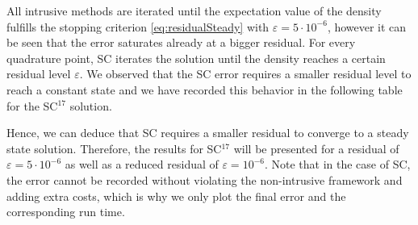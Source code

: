 All intrusive methods are iterated until the expectation value of the density fulfills the stopping criterion \eqref{eq:residualSteady} with $\varepsilon = 5\cdot 10^{-6}$, however it can be seen that the error saturates already at a bigger residual. For every quadrature point, SC iterates the solution until the density reaches a certain residual level $\varepsilon$. We observed that the SC error requires a smaller residual level to reach a constant state and we have recorded this behavior in the following table  for the SC$^{17}$ solution.
\begin{center}
\begin{table}
\caption{}
\label{tab:resSC17}
\end{table}

\end{center}
Hence, we can deduce that SC requires a smaller residual to converge to a steady state solution. Therefore, the results for SC$^{17}$ will be presented for a residual of $\varepsilon = 5\cdot 10^{-6}$ as well as a reduced residual of $\varepsilon = 10^{-6}$. Note that in the case of SC, the error cannot be recorded without violating the non-intrusive framework and adding extra costs, which is why we only plot the final error and the corresponding run time.    %

